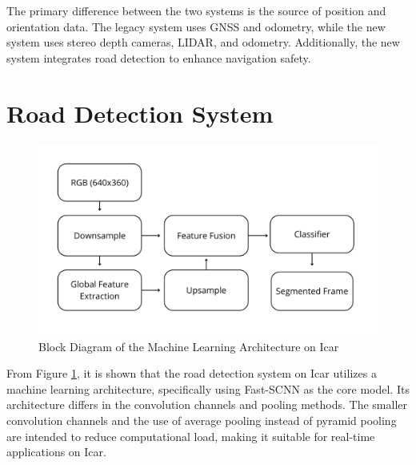 The primary difference between the two systems is the source of position and orientation data. The legacy system uses GNSS and odometry, while the new system uses stereo depth cameras, LIDAR, and odometry. Additionally, the new system integrates road detection to enhance navigation safety.

\section{Road Detection System}
\begin{figure}[H]
	\centering
	\includegraphics[width=\linewidth]{../konten/ml_sys.png}
	\caption{Block Diagram of the Machine Learning Architecture on Icar}
	\label{fig:ml_system}
\end{figure} 

From Figure \ref{fig:ml_system}, it is shown that the road detection system on Icar utilizes a machine learning architecture, specifically using Fast-SCNN \cite{ref_fast_scnn} as the core model. Its architecture differs in the convolution channels and pooling methods. The smaller convolution channels and the use of average pooling instead of pyramid pooling are intended to reduce computational load, making it suitable for real-time applications on Icar.

